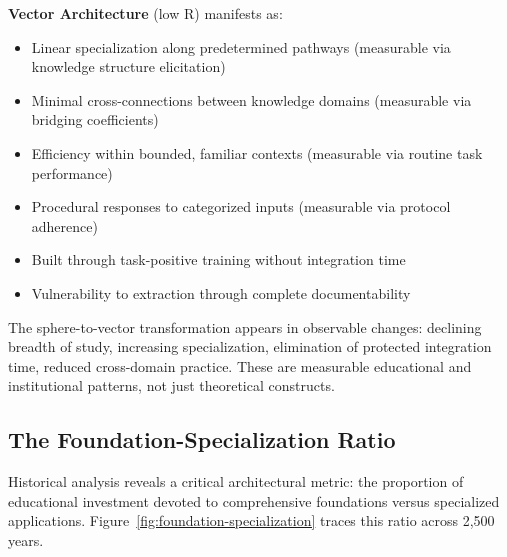 \textbf{Vector Architecture} (low R) manifests as:
\begin{itemize}
    \item Linear specialization along predetermined pathways (measurable via knowledge structure elicitation)
    \item Minimal cross-connections between knowledge domains (measurable via bridging coefficients)
    \item Efficiency within bounded, familiar contexts (measurable via routine task performance)
    \item Procedural responses to categorized inputs (measurable via protocol adherence)
    \item Built through task-positive training without integration time
    \item Vulnerability to extraction through complete documentability
\end{itemize}

The sphere-to-vector transformation appears in observable changes: declining breadth of study, increasing specialization, elimination of protected integration time, reduced cross-domain practice. These are measurable educational and institutional patterns, not just theoretical constructs.

\subsection{The Foundation-Specialization Ratio}

Historical analysis reveals a critical architectural metric: the proportion of educational investment devoted to comprehensive foundations versus specialized applications. Figure~\ref{fig:foundation-specialization} traces this ratio across 2,500 years.

